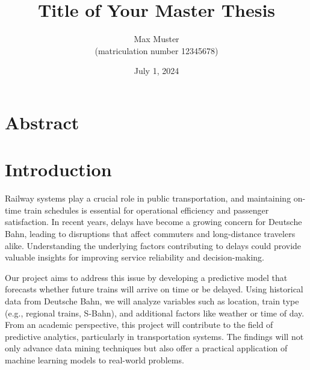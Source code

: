 \documentclass[a4paper,oneside,bibliography=totoc]{scrbook}
\begin{document}
\frontmatter \subject{Master Thesis} %
\title{Title of Your Master Thesis}
\author{Max Muster\\
  (matriculation number 12345678)} \date{July 1, 2024}
\publishers{{\small Submitted to}\\
  Data and Web Science Group\\
  Prof.\ Dr.\ Right-Name-Here\\
  University of Mannheim\\}
\maketitle

\chapter{Abstract}

\begingroup%
\hypersetup{hidelinks}%
\tableofcontents%
\endgroup



\mainmatter

\chapter{Introduction}
\label{ch:intro}

Railway systems play a crucial role in public transportation, and maintaining on-time train schedules is essential for operational efficiency and passenger satisfaction. In recent years, delays have become a growing concern for Deutsche Bahn, leading to disruptions that affect commuters and long-distance travelers alike. Understanding the underlying factors contributing to delays could provide valuable insights for improving service reliability and decision-making.

Our project aims to address this issue by developing a predictive model that forecasts whether future trains will arrive on time or be delayed. Using historical data from Deutsche Bahn, we will analyze variables such as location, train type (e.g., regional trains, S-Bahn), and additional factors like weather or time of day. From an academic perspective, this project will contribute to the field of predictive analytics, particularly in transportation systems. The findings will not only advance data mining techniques but also offer a practical application of machine learning models to real-world problems.
\end{document}

